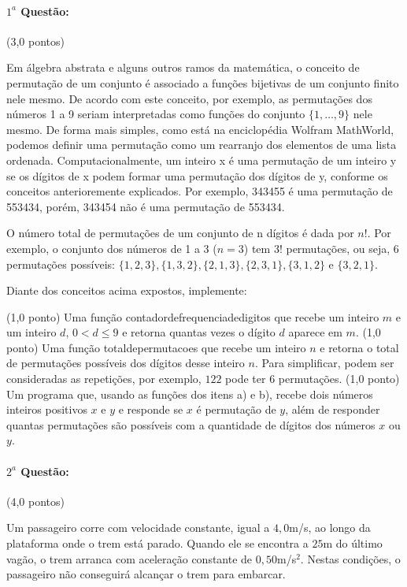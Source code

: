 \documentclass[12pt,a4paper]{article}
\begin{document}
\paragraph{$1^a$ Questão:} (3,0 pontos)

Em álgebra abstrata e alguns outros ramos da matemática, o conceito de permutação de um conjunto é associado a funções bijetivas 
de um conjunto finito nele mesmo. De acordo com este conceito, por exemplo, as permutações dos números 1 a 9 seriam interpretadas 
como funções do conjunto $\{1,\dots,9\}$ nele mesmo. De forma mais simples, como está na enciclopédia Wolfram MathWorld, podemos 
definir uma permutação como um rearranjo dos elementos de uma lista ordenada. Computacionalmente, um inteiro x é uma permutação 
de um inteiro y se os dígitos de x podem formar uma permutação dos dígitos de y, conforme os conceitos anterioremente explicados. Por 
exemplo, 343455 é uma permutação de 553434, porém, 343454 não é uma permutação de 553434.

O número total de permutações de um conjunto de n dígitos é dada por $n!$. Por exemplo, o conjunto dos números de 1 a 3 ($n=3$) tem $3!$ 
permutações, ou seja, 6 permutações possíveis: $\{1,2,3\},\{1,3,2\},\{2,1,3\},\{2,3,1\},\{3,1,2\}$ e $\{3,2,1\}$.

Diante dos conceitos acima expostos, implemente:
\begin{tasks}
\task (1,0 ponto) Uma função contadordefrequenciadedigitos que recebe um inteiro $m$ e um inteiro $d$, $0<d\leq 9$ e retorna 
quantas vezes o dígito $d$ aparece em $m$. 
\task (1,0 ponto) Uma função totaldepermutacoes que recebe um inteiro $n$ e retorna o total de permutações possíveis dos dígitos 
desse inteiro $n$. Para simplificar, podem ser consideradas as repetições, por exemplo, $122$ pode ter $6$ permutações.
\task (1,0 ponto) Um programa que, usando as funções dos itens a) e b), recebe dois números inteiros positivos $x$ e $y$ e responde
se $x$ é permutação de $y$, além de responder quantas permutações são possíveis com a quantidade de dígitos dos números $x$ ou $y$.
\end{tasks}

\paragraph{$2^a$ Questão:} (4,0 pontos)

Um passageiro corre com velocidade constante, igual a $4,0$m/s, ao longo da plataforma onde o trem está parado. Quando ele 
se encontra a $25$m do último vagão, o trem arranca com aceleração constante de $0,50$m/s$^2$. Nestas condições, o passageiro 
não conseguirá alcançar o trem para embarcar. 
\end{document}
